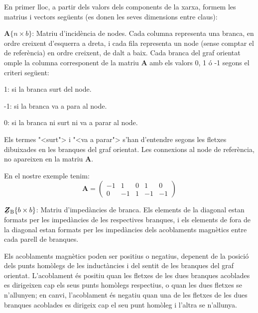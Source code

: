 En primer lloc, a partir dels valors dels components de la xarxa, formem les matrius i vectors seg\"{u}ents (es donen les seves dimensions entre claus):
\begin{list}{}
{\setlength{\labelwidth}{20mm} \setlength{\leftmargin}{22mm} \setlength{\labelsep}{2mm}}
   \item[$\boldsymbol{A}\{n\times b\}$:] Matriu d'incid\`{e}ncia de nodes. Cada columna representa una branca, en ordre creixent d'esquerra a dreta, i cada fila representa un node (sense comptar el de refer\`{e}ncia) en ordre creixent, de dalt a baix. Cada branca del graf orientat omple la columna corresponent de la matriu $\boldsymbol{A}$ amb els valors 0, 1 \'{o} -1 segons el criteri seg\"{u}ent:
   \begin{list}{}
   {\setlength{\labelwidth}{7mm} \setlength{\leftmargin}{9mm} \setlength{\labelsep}{2mm}}
      \item[1:]  si la branca surt del node.
      \item[-1:] si la branca va a para al node.
      \item[0:]  si la branca ni surt ni va a parar al node.
   \end{list}
   Els termes {"<}surt{">} i {"<}va a parar{">} s'han d'entendre segons les fletxes dibuixades en les branques del graf orientat. Les connexions al node de refer\`{e}ncia, no apareixen en la matriu $\boldsymbol{A}$.

   En el nostre exemple tenim:
   \[
      \boldsymbol{A} = \left(\begin{array}{rrrrr} -1 & 1  & 0 &  1 & 0 \\  0 & -1 & 1 & -1 & -1
                   \end{array} \right)
   \]

   \item[$\mcmplx{Z}\ped{B}\{b\times b\}$:] Matriu d'imped\`{a}ncies de branca. Els elements de la diagonal estan formats per les imped\`{a}ncies de les respectives branques, i els elements de fora de la diagonal estan formats per les imped\`{a}ncies dels acoblaments magn\`{e}tics entre cada parell de branques.

   Els acoblaments magn\`{e}tics poden ser positius o negatius, depenent
    de la posici\'{o} dels punts hom\`{o}legs de les induct\`{a}ncies i del sentit
    de les branques del graf orientat. L'acoblament \'{e}s positiu quan les
    fletxes de les dues branques acoblades es dirigeixen cap els seus punts
    hom\`{o}legs respectius, o quan les dues fletxes se n'allunyen; en canvi,
    l'acoblament \'{e}s negatiu quan una de les fletxes de les dues branques
    acoblades es dirigeix cap el seu punt hom\`{o}leg i l'altra se n'allunya.


\end{list}
